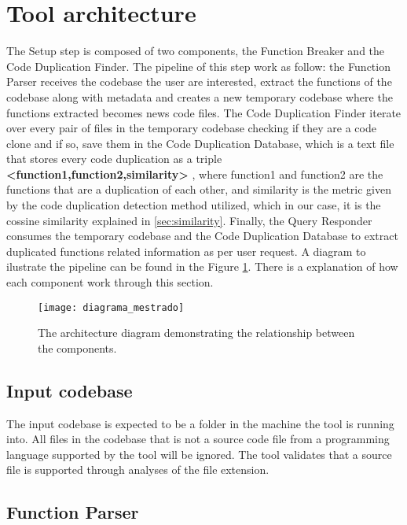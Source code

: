 \en

\section{Tool architecture}
\label{subsec:architecture}

The Setup step is composed of two components, the Function Breaker and the Code Duplication Finder. The pipeline of this step work as
follow: the Function Parser receives the codebase the user are interested, extract the functions of the codebase along with metadata 
and
creates a new temporary codebase where the functions extracted becomes news code files. 
The Code Duplication Finder iterate over every pair of 
files in the temporary codebase checking if they are a code clone and if so, save them in the Code Duplication Database, 
which is a text file
that stores every code duplication as a triple \textbf{<function1,function2,similarity>}
, where function1 and function2 are the functions that 
are a duplication of each other, and similarity is the metric given by the code duplication detection method utilized, which in our case, 
it is
the cossine similarity explained in \ref{sec:similarity}. Finally, the Query Responder consumes the temporary codebase and the 
Code Duplication Database to extract duplicated functions related information as per user request. A diagram to ilustrate the pipeline
can be found in the Figure \ref{fig:diagram}. There is a explanation of how each component work through this section.

\begin{figure}
\texttt{[image: diagrama\_mestrado]}
\caption{The architecture diagram demonstrating the relationship between the components.}
\label{fig:diagram}
\end{figure}

\subsection{Input codebase}

The input codebase is expected to be a folder in the machine the tool is running into. All files in the codebase that is not a source
code file from a programming language supported by the tool will be ignored. The tool validates that a source file is supported through
analyses of the file extension.

\subsection{Function Parser}

